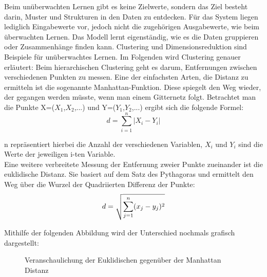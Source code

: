 Beim unüberwachten Lernen gibt es keine Zielwerte, sondern das Ziel besteht
darin, Muster und Strukturen in den Daten zu entdecken. Für das System liegen
lediglich Eingabewerte vor, jedoch nicht die zugehörigen Ausgabewerte, wie beim
überwachten Lernen.\cite{lanquillon2019grundzuge} Das Modell lernt eigenständig,
wie es die Daten gruppieren oder Zusammenhänge finden kann. Clustering und
Dimensionsreduktion sind Beispiele für unüberwachtes Lernen. Im Folgenden wird
Clustering genauer erläutert: Beim hierarchischen Clustering geht es darum,
Entfernungen zwischen verschiedenen Punkten zu messen. Eine der einfachsten
Arten, die Distanz zu ermitteln ist die sogenannte Manhattan-Funktion. Diese
spiegelt den Weg wieder, der gegangen werden müsste, wenn man einem Gitternetz
folgt. Betrachtet man die Punkte X=($X_1$,$X_2$,...) und Y=($Y_1$,$Y_2$,...)
ergibt sich die folgende Formel:
\begin{equation*}
    d = \sum_{i=1}^n |X_i -Y_i|
\end{equation*}

n repräsentiert hierbei die Anzahl der verschiedenen Variablen, $X_i$ und $Y_i$
sind die Werte der jeweiligen i-ten Variable.\\

Eine weitere verbreitete Messung der Entfernung zweier Punkte zueinander ist
die euklidische Distanz. Sie basiert auf dem Satz des Pythagoras und ermittelt
den Weg über die Wurzel der Quadriierten Differenz der Punkte:
\begin{equation*}
    \let\oldsqrt\sqrt
    d = \sqrt{\sum_{j=1}^n (x_j-y_j)^2}
\end{equation*}
\cite{madhulatha2012overview}

Mithilfe der folgenden Abbildung wird der Unterschied nochmals grafisch
dargestellt:
\begin{figure}[h]
    \centering
    
    \caption[width=0.7\columnwidth]{Veranschaulichung der Euklidischen gegenüber der Manhattan Distanz}
    \label{fig:dist}
\end{figure}
